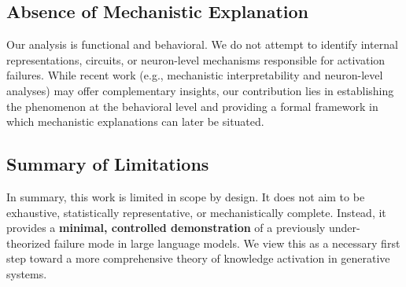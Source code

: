 \subsection{Absence of Mechanistic Explanation}

Our analysis is functional and behavioral. We do not attempt to identify internal representations, circuits, or neuron-level mechanisms responsible for activation failures. While recent work (e.g., mechanistic interpretability and neuron-level analyses) may offer complementary insights, our contribution lies in establishing the phenomenon at the behavioral level and providing a formal framework in which mechanistic explanations can later be situated.


\subsection{Summary of Limitations}

In summary, this work is limited in scope by design. It does not aim to be exhaustive, statistically representative, or mechanistically complete. Instead, it provides a \textbf{minimal, controlled demonstration} of a previously under-theorized failure mode in large language models. We view this as a necessary first step toward a more comprehensive theory of knowledge activation in generative systems.


%
%
